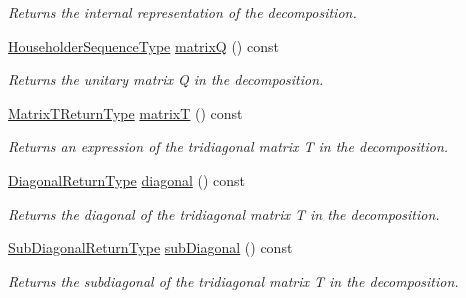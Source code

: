 \begin{DoxyCompactItemize}
\begin{DoxyCompactList}\small\item\em Returns the internal representation of the decomposition. \end{DoxyCompactList}\item 
\mbox{\hyperlink{class_eigen_1_1_tridiagonalization_af322315c8bea9990152c9d09bfa2a69f}{Householder\+Sequence\+Type}} \mbox{\hyperlink{class_eigen_1_1_tridiagonalization_a000f7392eda930576ffd2af1fae54af2}{matrixQ}} () const
\begin{DoxyCompactList}\small\item\em Returns the unitary matrix Q in the decomposition. \end{DoxyCompactList}\item 
\mbox{\hyperlink{struct_eigen_1_1internal_1_1_tridiagonalization_matrix_t_return_type}{Matrix\+T\+Return\+Type}} \mbox{\hyperlink{class_eigen_1_1_tridiagonalization_a6eb5ef94b8b9bb013c0e69b6df56d0df}{matrixT}} () const
\begin{DoxyCompactList}\small\item\em Returns an expression of the tridiagonal matrix T in the decomposition. \end{DoxyCompactList}\item 
\mbox{\hyperlink{struct_eigen_1_1internal_1_1true__type}{Diagonal\+Return\+Type}} \mbox{\hyperlink{class_eigen_1_1_tridiagonalization_a0b7ff4860aa6f7c0761b1059c012fd8e}{diagonal}} () const
\begin{DoxyCompactList}\small\item\em Returns the diagonal of the tridiagonal matrix T in the decomposition. \end{DoxyCompactList}\item 
\mbox{\hyperlink{struct_eigen_1_1internal_1_1true__type}{Sub\+Diagonal\+Return\+Type}} \mbox{\hyperlink{class_eigen_1_1_tridiagonalization_ac423dbb91157c159bdcb4b5a8371232e}{sub\+Diagonal}} () const
\begin{DoxyCompactList}\small\item\em Returns the subdiagonal of the tridiagonal matrix T in the decomposition. \end{DoxyCompactList}\end{DoxyCompactItemize}
